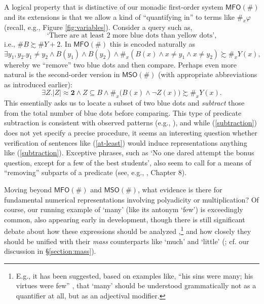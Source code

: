 \documentclass[12pt,oneside,reqno]{amsart}
\theoremstyle{definition}
\begin{document}
A logical property that is distinctive of our monadic first-order system $\mathsf{MFO}(\#)$ and its extensions is that we allow a kind of ``quantifying in'' to terms like $\#_x\varphi$ (recall, e.g., Figure \ref{fig:variables}). %
Consider a query such as, \begin{equation} \label{at-least} \mbox{`There are at least }2\mbox{ more blue dots than yellow dots',} \end{equation} i.e., $\#B \succsim \#Y+2$. In $\mathsf{MFO}(\#)$ this is encoded naturally as $$\exists y_1,y_2. y_1 \neq y_2 \wedge B(y_1) \wedge B(y_2) \wedge \#_x(B(x) \wedge x\neq y_1 \wedge x \neq y_2) \succsim \#_x Y(x),$$ %
whereby we ``remove'' two blue dots and then compare. Perhaps even more natural is the second-order version in $\mathsf{MSO}(\#)$ (with appropriate abbreviations as introduced earlier): \begin{equation} \label{subtraction} \exists Z. |Z|\approx \mathbf{2} \wedge Z \subseteq B \wedge \#_x\big(B(x) \wedge \neg Z(x)\big) \succsim \#_x Y(x). \end{equation} This essentially asks us to locate a subset of two blue dots and  \emph{subtract} those from the total number of blue dots before comparing. This type of predicate subtraction is consistent with observed patterns (e.g., \citealt{Lidz2011}), and while (\ref{subtraction}) does not yet specify a precise procedure, it seems an interesting question whether verification of sentences like (\ref{at-least}) would induce representations anything like (\ref{subtraction}). Exceptive phrases, such as `No one dared attempt the bonus question, except for a few of the best students', also seem to call for a means of ``removing'' subparts of a predicate (see, e.g., \citealt{PetersWesterstahl}, Chapter 8).

\vspace{1ex}

Moving beyond $\mathsf{MFO}(\#)$ and $\mathsf{MSO}(\#)$, what evidence is there for fundamental numerical representations involving polyadicity or multiplication? Of course, our running example of `many' (like its antonym `few') is exceedingly common, also appearing early in development, though there is still significant debate about how  these expressions should be analyzed \citep{Rett},\footnote{E.g., it has been suggested, based on examples like, ``his sins were many; his virtues were few'' \citep{Hoeksema}, that `many' should be understood grammatically not as a quantifier at all, but as an adjectival modifier.} and how closely they should be unified with their \emph{mass} counterparts like `much' and `little' (\citealt{Rothstein}; cf. our discussion in \S\ref{section:mass}). %
\end{document}
